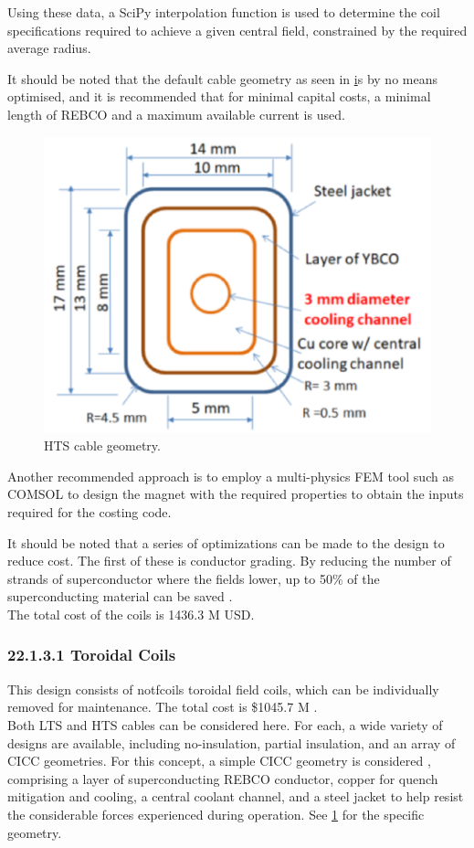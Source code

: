 Using these data, a SciPy interpolation function is used to determine the coil specifications required to achieve a given central field, constrained by the required average radius.

It should be noted that the default cable geometry as seen in \href{fig:yuhu_cs} is by no means optimised, and it is recommended that for minimal capital costs, a minimal length of REBCO and a maximum available current is used.


\begin{figure}[h]
    \centering
    \includegraphics[width =0.5\linewidth]{StandardFigures/yuhu_cs.pdf}
    \caption{HTS cable geometry.}
    \label{fig:yuhu_cs}
\end{figure}

Another recommended approach is to employ a multi-physics FEM tool such as COMSOL to design the magnet with the required properties to obtain the inputs required for the costing code.

It should be noted that a series of optimizations can be made to the design to reduce cost. The first of these is conductor grading. By reducing the number of strands of superconductor where the fields lower, up to 50\% of the superconducting material can be saved \cite{uglietti2018progressing}.\\

The total cost of the coils is 1436.3 M USD.


\subsubsection*{22.1.3.1 Toroidal Coils}

This design consists of notfcoils toroidal field coils, which can be individually removed for maintenance. The total cost is \$1045.7 M .\\

Both LTS and HTS cables can be considered here. For each, a wide variety of designs are available, including no-insulation, partial insulation, and an array of CICC geometries. For this concept, a simple CICC geometry is considered \cite{Menard2016}, comprising a layer of superconducting REBCO conductor, copper for quench mitigation and cooling, a central coolant channel, and a steel jacket to help resist the considerable forces experienced during operation. See \ref{fig:yuhu_cs} for the specific geometry.\\

